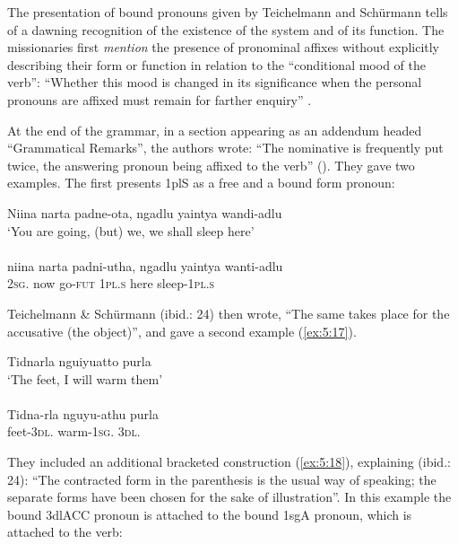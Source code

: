 The presentation of bound pronouns given by Teichelmann and Schürmann tells of a dawning recognition of the existence of the system and of its function. The missionaries first \textit{mention} the presence of pronominal affixes without explicitly describing their form or function in relation to the ``conditional mood of the verb'': “Whether this mood is changed in its significance when the personal pronouns are affixed must remain for farther enquiry” \citep[19]{teichelmann_outlines_1840}.

At the end of the grammar, in a section appearing as an addendum headed ``Grammatical Remarks'', the authors wrote: “The nominative is frequently put twice, the answering pronoun being affixed to the verb” (\citeyear[23]{teichelmann_outlines_1840}). They gave two examples. The first presents 1plS as a free and a bound form pronoun:

\ea\label{ex:5:16}
Niina	   narta     padne-ota,    ngadlu   yaintya   wandi-adlu \\
\glt `You are going, (but) we, we shall sleep here' \\
\citep[23]{teichelmann_outlines_1840} \\
\gll niina          narta    padni-utha,   ngadlu    yaintya   wanti-adlu \\
2\textsc{sg}.    now     go-\textsc{fut}           1\textsc{pl}.\textsc{s}        here        sleep-1\textsc{pl}.\textsc{s} \\
\z


Teichelmann \& Schürmann (ibid.: 24) then wrote, “The same takes place for the accusative (the object)”, and gave a second example (\ref{ex:5:17}).

\ea\label{ex:5:17}
Tidnarla     	nguiyuatto      	purla \\
\glt `The feet, I will warm them' \\
\citep[23]{teichelmann_outlines_1840} \\
\gll Tidna-rla   	nguyu-athu      	purla \\
feet-3\textsc{dl}.       warm-1\textsc{sg}.     3\textsc{dl}.                                    \\
\z



They included an additional bracketed construction (\ref{ex:5:18}), explaining (ibid.: 24): “The contracted form in the parenthesis is the usual way of speaking; the separate forms have been chosen for the sake of illustration”. In this example the bound 3dlACC pronoun is attached to the bound 1sgA pronoun, which is attached to the verb:

